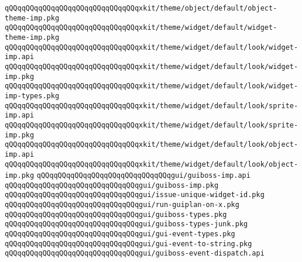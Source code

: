 \verb|qQQqqQQqqQQqqQQqqQQqqQQqqQQqqQQqxkit/theme/object/default/object-theme-imp.pkg|\newline
\verb|qQQqqQQqqQQqqQQqqQQqqQQqqQQqqQQqxkit/theme/widget/default/widget-theme-imp.pkg|\newline
\newline
\verb|qQQqqQQqqQQqqQQqqQQqqQQqqQQqqQQqxkit/theme/widget/default/look/widget-imp.api|\newline
\verb|qQQqqQQqqQQqqQQqqQQqqQQqqQQqqQQqxkit/theme/widget/default/look/widget-imp.pkg|\newline
\verb|qQQqqQQqqQQqqQQqqQQqqQQqqQQqqQQqxkit/theme/widget/default/look/widget-imp-types.pkg|\newline
\newline
\verb|qQQqqQQqqQQqqQQqqQQqqQQqqQQqqQQqxkit/theme/widget/default/look/sprite-imp.api|\newline
\verb|qQQqqQQqqQQqqQQqqQQqqQQqqQQqqQQqxkit/theme/widget/default/look/sprite-imp.pkg|\newline
\newline
\verb|qQQqqQQqqQQqqQQqqQQqqQQqqQQqqQQqxkit/theme/widget/default/look/object-imp.api|\newline
\verb|qQQqqQQqqQQqqQQqqQQqqQQqqQQqqQQqxkit/theme/widget/default/look/object-imp.pkg|\newline
\newline
\newline
\newline
\verb|qQQqqQQqqQQqqQQqqQQqqQQqqQQqqQQqgui/guiboss-imp.api|\newline
\verb|qQQqqQQqqQQqqQQqqQQqqQQqqQQqqQQqgui/guiboss-imp.pkg|\newline
\verb|qQQqqQQqqQQqqQQqqQQqqQQqqQQqqQQqgui/issue-unique-widget-id.pkg|\newline
\verb|qQQqqQQqqQQqqQQqqQQqqQQqqQQqqQQqgui/run-guiplan-on-x.pkg|\newline
\newline
\verb|qQQqqQQqqQQqqQQqqQQqqQQqqQQqqQQqgui/guiboss-types.pkg|\newline
\verb|qQQqqQQqqQQqqQQqqQQqqQQqqQQqqQQqgui/guiboss-types-junk.pkg|\newline
\newline
\verb|qQQqqQQqqQQqqQQqqQQqqQQqqQQqqQQqgui/gui-event-types.pkg|\newline
\verb|qQQqqQQqqQQqqQQqqQQqqQQqqQQqqQQqgui/gui-event-to-string.pkg|\newline
\newline
\verb|qQQqqQQqqQQqqQQqqQQqqQQqqQQqqQQqgui/guiboss-event-dispatch.api|\newline
